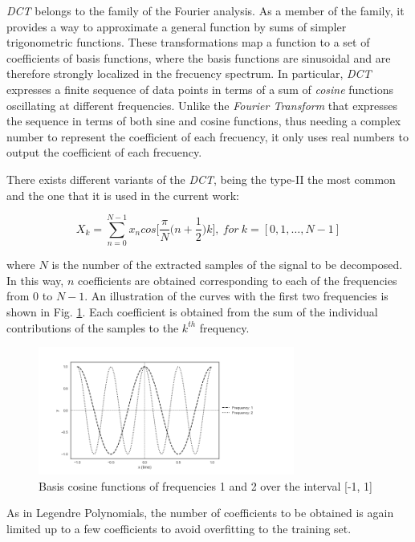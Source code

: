 \textit{DCT} belongs to the family of the Fourier analysis. As a member of the family, it
provides a way to approximate a general function by sums of simpler trigonometric functions.
These transformations map a function to a set of coefficients of basis functions, where
the basis functions are sinusoidal and are therefore strongly localized in the frecuency spectrum.
In particular, \textit{DCT} expresses a finite sequence of data points in terms of a sum of
\textit{cosine} functions oscillating at different frequencies. Unlike the
\textit{Fourier Transform} that expresses the sequence in terms of both sine and cosine functions,
thus needing a complex number to represent the coefficient of each frecuency, it only uses real
numbers to output the coefficient of each frecuency.

There exists different variants of the \textit{DCT}, being the type-II
the most common and the one that it is used in the current work:

\begin{equation}
X_{k} = \sum_{n=0}^{N-1} x_{n} cos \Big[ \frac{\pi}{N} \Big( n + \frac{1}{2} \Big) k \Big], \ for \ k = [0, 1, \dotsc, N-1]
\end{equation}

where $N$ is the number of the extracted samples of the signal to be decomposed.
In this way, $n$ coefficients are obtained corresponding to each of the frequencies from
$0$ to $N-1$. An illustration of the curves with the first two frequencies is shown in
Fig. \ref{fig:dct_base}. Each coefficient is obtained from the sum of the individual contributions
of the samples to the $k^{th}$ frequency.

\begin{figure}[H]
  \centering
  \includegraphics[width=0.75\textwidth]{files/figures/method/dct_base}
  \centering
  \caption{Basis cosine functions of frequencies 1 and 2 over the interval [-1, 1]}
  \label{fig:dct_base}
\end{figure}

As in Legendre Polynomials,
the number of coefficients to be obtained is again limited up to a few coefficients to
avoid overfitting to the training set.

